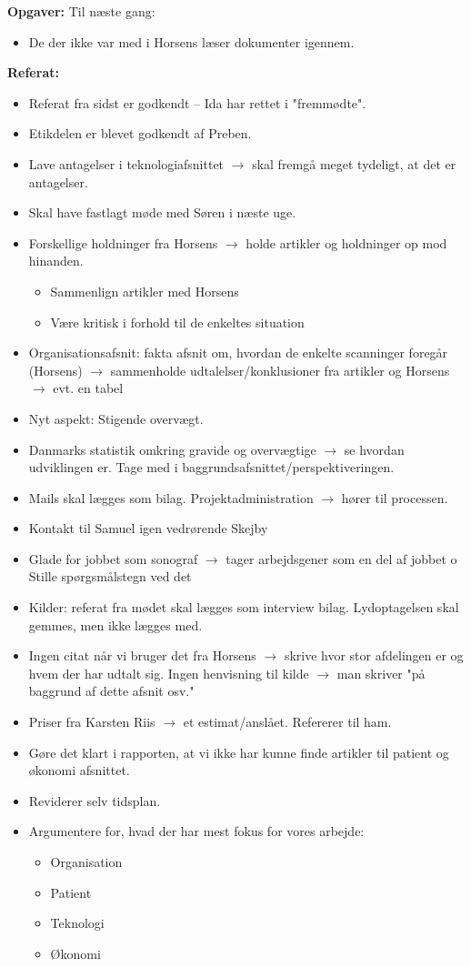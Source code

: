 \textbf{Opgaver:} \newline
Til næste gang:
\begin{itemize}
\item De der ikke var med i Horsens læser dokumenter igennem.
\end{itemize}
\textbf{Referat:}
\begin{itemize}
\item Referat fra sidst er godkendt – Ida har rettet i "fremmødte". 
\item Etikdelen er blevet godkendt af Preben. 
\item Lave antagelser i teknologiafsnittet $\rightarrow$ skal fremgå meget tydeligt, at det er antagelser. 
\item Skal have fastlagt møde med Søren i næste uge.
\item Forskellige holdninger fra Horsens $\rightarrow$ holde artikler og holdninger op mod hinanden. 
\begin{itemize}
\item Sammenlign artikler med Horsens
\item Være kritisk i forhold til de enkeltes situation
\end{itemize}
\item Organisationsafsnit: fakta afsnit om, hvordan de enkelte scanninger foregår (Horsens) $\rightarrow$ sammenholde udtalelser/konklusioner fra artikler og Horsens $\rightarrow$ evt. en tabel
\item Nyt aspekt: Stigende overvægt. 
\item Danmarks statistik omkring gravide og overvægtige $\rightarrow$ se hvordan udviklingen er. Tage med i baggrundsafsnittet/perspektiveringen. 
\item Mails skal lægges som bilag. Projektadministration $\rightarrow$ hører til processen. 
\item Kontakt til Samuel igen vedrørende Skejby
\item Glade for jobbet som sonograf $\rightarrow$ tager arbejdsgener som en del af jobbet 
o	Stille spørgsmålstegn ved det 
\item Kilder: referat fra mødet skal lægges som interview bilag. Lydoptagelsen skal gemmes, men ikke lægges med. 
\item Ingen citat når vi bruger det fra Horsens $\rightarrow$ skrive hvor stor afdelingen er og hvem der har udtalt sig. Ingen henvisning til kilde $\rightarrow$ man skriver "på baggrund af dette afsnit osv." 
\item Priser fra Karsten Riis $\rightarrow$ et estimat/anslået. Refererer til ham.
\item Gøre det klart i rapporten, at vi ikke har kunne finde artikler til patient og økonomi afsnittet. 
\item Reviderer selv tidsplan.
\item Argumentere for, hvad der har mest fokus for vores arbejde:
\begin{itemize}
\item Organisation
\item Patient
\item Teknologi
\item Økonomi
\end{itemize}
\end{itemize}

\newpage


